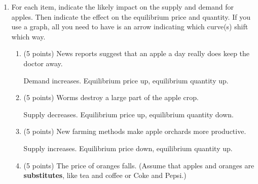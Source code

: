 \documentclass{article}
\newcommand{\mybigskip}{\vspace{1in}}
\begin{document}
\begin{enumerate}












\item \begin{EXAM} For each item, indicate the likely impact on the supply and demand for apples. Then indicate the effect on the equilibrium price and quantity. If you use a graph, all you need to have is an arrow indicating which curve(s) shift which way. \end{EXAM}

    \begin{enumerate}

    \item \begin{EXAM} (5 points) News reports suggest that an apple a day really does keep the doctor away. \mybigskip \end{EXAM}

\begin{KEY} Demand increases. Equilibrium price up, equilibrium quantity up.\end{KEY}


    \item \begin{EXAM} (5 points) Worms destroy a large part of the apple crop. \mybigskip \end{EXAM}

\begin{KEY} Supply decreases. Equilibrium price up, equilibrium quantity down.\end{KEY}


    \item \begin{EXAM} (5 points) New farming methods make apple orchards more productive. \mybigskip \end{EXAM}

\begin{KEY} Supply increases. Equilibrium price down, equilibrium quantity up.\end{KEY}


    \item \begin{EXAM} (5 points) The price of oranges falls. (Assume that apples and oranges are \textbf{substitutes}, like tea and coffee or Coke and Pepsi.) \mybigskip \end{EXAM}


\end{enumerate}
\end{enumerate}
\end{document}
